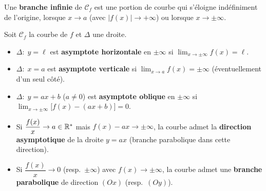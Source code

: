 \begin{definition}
	Une \textbf{branche infinie} de $\mathcal C_f$ est une portion de courbe
	qui s'éloigne indéfiniment de l'origine, lorsque $x\to a$ (avec
	$|f(x)|\to+\infty$) ou lorsque $x\to\pm\infty$.
\end{definition}

\begin{definition}
	Soit $\mathcal C_f$ la courbe de $f$ et $\Delta$ une droite.
	\begin{itemize}[label=\textbullet]
		\item $\Delta:\;y=\ell$ est \textbf{asymptote horizontale} en $\pm\infty$
		si $\displaystyle\lim_{x\to\pm\infty}f(x)=\ell$.
		\item $\Delta:\;x=a$ est \textbf{asymptote verticale} si
		$\displaystyle\lim_{x\to a}f(x)=\pm\infty$ (éventuellement d'un seul côté).
		\item $\Delta:\;y=ax+b$ ($a\neq 0$) est \textbf{asymptote oblique} en
		$\pm\infty$ si $\displaystyle\lim_{x\to\pm\infty}\bigl[f(x)-(ax+b)\bigr]=0$.
		\item Si $\dfrac{f(x)}{x}\to a\in\mathbb{R}^*$ mais $f(x)-ax\to\pm\infty$, la
		courbe admet la \textbf{direction asymptotique} de la droite $y=ax$
		(branche parabolique dans cette direction).
		\item Si $\dfrac{f(x)}{x}\to 0$ (resp.\ $\pm\infty$) avec
		$f(x)\to\pm\infty$, la courbe admet une \textbf{branche parabolique} de
		direction $(Ox)$ (resp.\ $(Oy)$).
	\end{itemize}
\end{definition}

